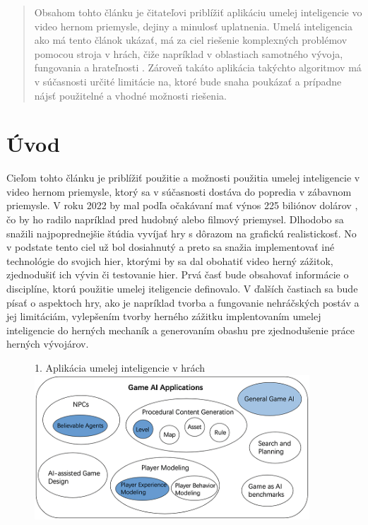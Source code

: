 \documentclass{article}
\author{Ondrej Podhorsky\\[2pt]
	{\small Slovenská technická univerzita v Bratislave}\\
	{\small Fakulta informatiky a informačných technológií}\\
	{\small \texttt{xpodhorsky@stuba.sk}}
	}
\date{\small 6. november 2022}
\begin{document}
\maketitle

\begin{abstract}

Obsahom tohto článku je čitateľovi priblížiť aplikáciu umelej inteligencie vo video hernom priemysle, dejiny a minulosť uplatnenia. Umelá inteligencia ako má tento článok ukázať, má za ciel riešenie komplexných problémov pomocou stroja v hrách, čiže napríklad v oblastiach samotného vývoja, fungovania a hrateľnosti . Zároveň takáto aplikácia takýchto algoritmov má v súčasnosti určité limitácie na, ktoré bude snaha poukázať a prípadne nájsť použitelné a vhodné možnosti riešenia.

\end{abstract}

\clearpage

\section{Úvod}

Cieľom tohto článku je priblížiť použitie a možnosti použitia umelej inteligencie v video hernom priemysle, ktorý sa v súčasnosti dostáva do popredia v zábavnom priemysle. V roku 2022 by mal podľa očakávaní mať výnos 225 biliónov dolárov \cite{TeodoraDobrilovat}, čo by ho radilo napríklad pred hudobný alebo filmový priemysel. Dlhodobo sa snažili najpoprednejšie štúdia vyvíjať hry s dôrazom  na grafickú realistickosť. No v podstate tento ciel už bol dosiahnutý a preto sa snažia implementovať iné technológie do svojich hier, ktorými by sa dal obohatiť video herný zážitok, zjednodušiť ich vývin či testovanie hier. Prvá časť bude obsahovať informácie o disciplíne, ktorú použitie umelej iteligencie definovalo. V ďalších častiach sa bude písať o aspektoch hry, ako je napríklad tvorba a fungovanie nehráčských postáv a jej limitáciám, vylepšením tvorby herného zážitku implentovaním umelej inteligencie do herných mechaník a generovaním obashu pre zjednodušenie práce herných vývojárov.

\begin{figure}[ht]{1. Aplikácia umelej inteligencie v hrách\cite{inproceedings}}
\centering
\includegraphics[width=103mm]{Game-AI-Applications.png}
\end{figure}
\end{document}
